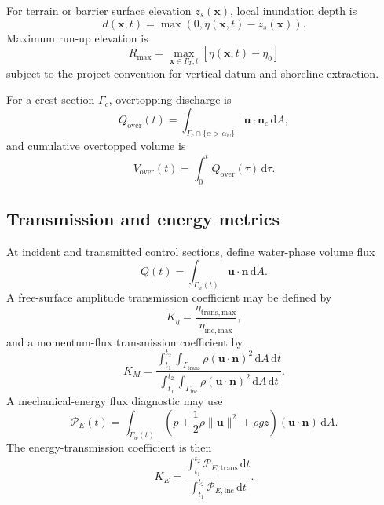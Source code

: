 \documentclass[11pt,a4paper]{article}
\newcommand{\vect}[1]{\bm{#1}}
\newcommand{\dd}{\mathrm{d}}
\begin{document}
For terrain or barrier surface elevation $z_s(\vect x)$, local inundation depth is
\begin{equation}
  d(\vect x,t)=\max\left(0,\eta(\vect x,t)-z_s(\vect x)\right).
\end{equation}
Maximum run-up elevation is
\begin{equation}
  R_{\max}=\max_{\vect x\in\Gamma_T,t}\left[\eta(\vect x,t)-\eta_0\right]
\end{equation}
subject to the project convention for vertical datum and shoreline extraction.

For a crest section $\Gamma_c$, overtopping discharge is
\begin{equation}
  Q_{\mathrm{over}}(t)=
  \int_{\Gamma_c\cap\{\alpha>\alpha_w\}}
  \vect u\cdot\vect n_c\,\dd A,
\end{equation}
and cumulative overtopped volume is
\begin{equation}
  V_{\mathrm{over}}(t)=\int_0^tQ_{\mathrm{over}}(\tau)\,\dd\tau.
\end{equation}

\subsection{Transmission and energy metrics}

At incident and transmitted control sections, define water-phase volume flux
\begin{equation}
  Q(t)=\int_{\Gamma_w(t)}\vect u\cdot\vect n\,\dd A.
\end{equation}
A free-surface amplitude transmission coefficient may be defined by
\begin{equation}
  K_\eta=\frac{\eta_{\mathrm{trans,max}}}{\eta_{\mathrm{inc,max}}},
\end{equation}
and a momentum-flux transmission coefficient by
\begin{equation}
  K_M=
  \frac{\displaystyle\int_{t_1}^{t_2}\int_{\Gamma_{\mathrm{trans}}}
  \rho(\vect u\cdot\vect n)^2\,\dd A\,\dd t}
  {\displaystyle\int_{t_1}^{t_2}\int_{\Gamma_{\mathrm{inc}}}
  \rho(\vect u\cdot\vect n)^2\,\dd A\,\dd t}.
\end{equation}
A mechanical-energy flux diagnostic may use
\begin{equation}
  \mathcal P_E(t)=
  \int_{\Gamma_w(t)}
  \left(p+\frac{1}{2}\rho\|\vect u\|^2+\rho gz\right)
  (\vect u\cdot\vect n)\,\dd A.
\end{equation}
The energy-transmission coefficient is then
\begin{equation}
  K_E=
  \frac{\int_{t_1}^{t_2}\mathcal P_{E,\mathrm{trans}}\,\dd t}
  {\int_{t_1}^{t_2}\mathcal P_{E,\mathrm{inc}}\,\dd t}.
\end{equation}
\end{document}
